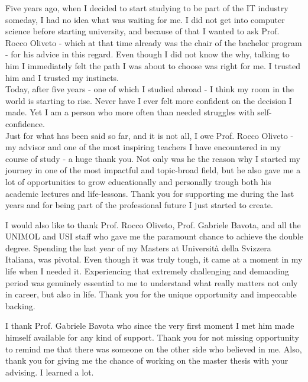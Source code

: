 \begin{acknowledgements}

\addchaptertocentry{\acknowledgementname}
Five years ago, when I decided to start studying to be part of the IT industry someday, 
I had no idea what was waiting for me. 
I did not get into computer science before starting university, and because of that 
I wanted to ask Prof. Rocco Oliveto - which at that time already was the chair of the bachelor program - for his advice 
in this regard. Even though I did not know the why, talking to him I immediately felt the path I was about to choose was right for me. 
I trusted him and I trusted my instincts. \\
Today, after five years - one of which I studied abroad - I think my room in the world is starting to rise.
Never have I ever felt more confident on the decision I made. Yet I am a person who more often than needed struggles with self-confidence.\\
\newline
Just for what has been said so far, and it is not all, I owe Prof. Rocco Oliveto - my advisor and one of the most inspiring teachers I have encountered
in my course of study - a huge thank you. Not only was he the reason why I started my journey in one of the most impactful and topic-broad field, 
but he also gave me a lot of opportunities to grow educationally and personally trough both his academic lectures and life-lessons.
Thank you for supporting me during the last years and for being part of the professional future I just started to create.

I would also like to thank Prof. Rocco Oliveto, Prof. Gabriele Bavota, and all the UNIMOL and USI staff who gave me the paramount chance to 
achieve the double degree. 
Spending the last year of my Masters at Università della Svizzera Italiana, was pivotal. Even though it was
truly tough, it came at a moment in my life when I needed it. 
Experiencing that extremely challenging and demanding 
period was genuinely essential to me to understand what really matters not only in career, but also in life. Thank you 
for the unique opportunity and impeccable backing.

I thank Prof. Gabriele Bavota who since the very first moment I met him made himself available for any kind of support. 
Thank you for not missing opportunity to remind me that there was someone on the other side who believed in me. Also, thank you 
for giving me the chance of working on the master thesis with your advising. I learned a lot.


\end{acknowledgements}
